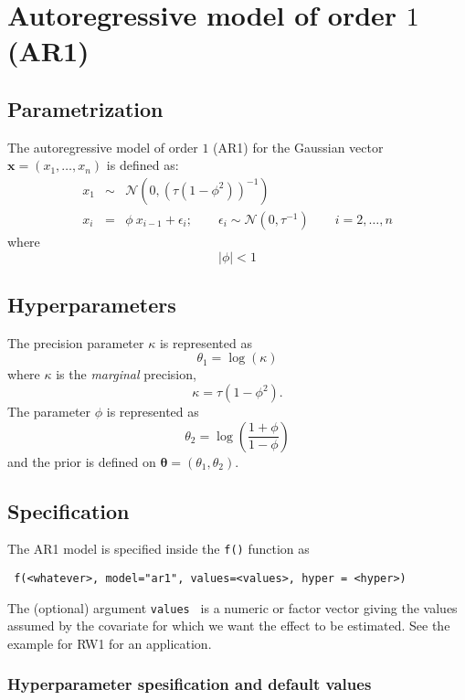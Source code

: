 \documentclass[a4paper,11pt]{article}
\begin{document}
\section*{Autoregressive model of order $1$ (AR1)}

\subsection*{Parametrization}

The autoregressive model of order $1$ (AR1) for the Gaussian vector
$\mathbf{x}=(x_1,\dots,x_n)$ is defined as:
\begin{eqnarray}\nonumber
    x_1&\sim&\mathcal{N}(0,(\tau(1-\phi^2))^{-1}) \\\nonumber
    x_i&=&\phi\ x_{i-1}+\epsilon_i; \qquad \epsilon_i\sim\mathcal{N}(0,\tau^{-1}) \qquad  i=2,\dots,n
\end{eqnarray}
where
\[
|\phi|<1
\]

\subsection*{Hyperparameters}

The precision parameter $\kappa$ is represented as
\begin{displaymath}
    \theta_1 =\log(\kappa) 
\end{displaymath}
where $\kappa$ is the \emph{marginal} precision,
\begin{displaymath}
    \kappa = \tau (1-\phi^{2}).
\end{displaymath}
The parameter $\phi$ is represented as
\[
\theta_2 = \log\left(\frac{1+\phi}{1-\phi}\right)
\]
and the prior is defined on $\mathbf{\theta}=(\theta_1,\theta_2)$. 

\subsection*{Specification}

The AR1 model is specified inside the {\tt f()} function as
\begin{verbatim}
 f(<whatever>, model="ar1", values=<values>, hyper = <hyper>)
\end{verbatim}
The (optional) argument {\tt values } is a numeric or factor vector
giving the values assumed by the covariate for which we want the
effect to be estimated. See the example for RW1 for an application.

\subsubsection*{Hyperparameter spesification and default values}

\end{document}
